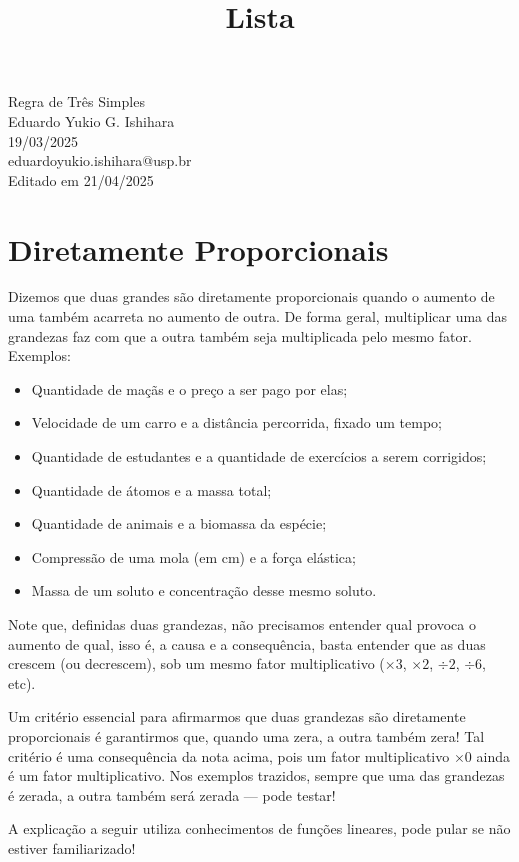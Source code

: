 \documentclass[12pt]{report}
\title{Lista}
\newcommand{\1}{\faThermometerEmpty}
\newcommand{\2}{\faThermometerQuarter}
\newcommand{\3}{\faThermometerHalf}
\newcommand{\4}{\faThermometerThreeQuarters}
\newcommand{\5}{\faThermometerFull}
\begin{document}
\begin{center}
{\Large Regra de Três Simples} \\ %
\vspace{1mm}
Eduardo Yukio G. Ishihara \\ 19/03/2025 \\ %
{\footnotesize eduardoyukio.ishihara@usp.br \\
Editado em 21/04/2025} %
\end{center}
\vspace{5mm}


\section*{Diretamente Proporcionais}
Dizemos que duas grandes são diretamente proporcionais quando o aumento de uma também acarreta no aumento de outra. De forma geral, multiplicar uma das grandezas faz com que a outra também seja multiplicada pelo mesmo fator.
Exemplos:
\begin{itemize}
    \item Quantidade de maçãs e o preço a ser pago por elas;
    \item Velocidade de um carro e a distância percorrida, fixado um tempo;
    \item Quantidade de estudantes e a quantidade de exercícios a serem corrigidos;
    \item Quantidade de átomos e a massa total;
    \item Quantidade de animais e a biomassa da espécie;
    \item Compressão de uma mola (em cm) e a força elástica;
    \item Massa de um soluto e concentração desse mesmo soluto.
\end{itemize}
Note que, definidas duas grandezas, não precisamos entender qual provoca o aumento de qual, isso é, a causa e a consequência, basta entender que as duas crescem (ou decrescem), sob um mesmo fator multiplicativo ($\times 3$, $\times 2$, $\div 2$, $\div 6$, etc).

Um critério essencial para afirmarmos que duas grandezas são diretamente proporcionais é garantirmos que, quando uma zera, a outra também zera! Tal critério é uma consequência da nota acima, pois um fator multiplicativo $\times 0$ ainda é um fator multiplicativo. Nos exemplos trazidos, sempre que uma das grandezas é zerada, a outra também será zerada — pode testar!

{\footnotesize A explicação a seguir utiliza conhecimentos de funções lineares, pode pular se não estiver familiarizado!}
\end{document}
